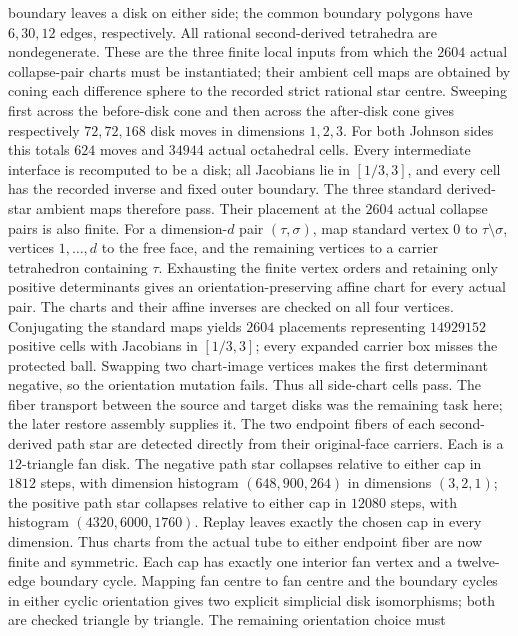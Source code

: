 \documentclass[11pt]{amsart}
\theoremstyle{definition}
\theoremstyle{remark}
\begin{document}
boundary leaves a disk on either side; the common boundary polygons have
$6,30,12$ edges, respectively.  All rational second-derived tetrahedra are
nondegenerate.  These are the three finite local inputs from which the $2604$
actual collapse-pair charts must be instantiated; their ambient cell maps
are obtained by coning each difference sphere to the recorded strict rational
star centre.  Sweeping first across the before-disk cone and then across the
after-disk cone gives respectively $72,72,168$ disk moves in dimensions
$1,2,3$.  For both Johnson sides this totals $624$ moves and $34944$ actual
octahedral cells.  Every intermediate interface is recomputed to be a disk;
all Jacobians lie in $[1/3,3]$, and every cell has the recorded inverse and
fixed outer boundary.  The three standard derived-star ambient maps therefore
pass.  Their placement at the $2604$ actual collapse pairs is also finite.
For a dimension-$d$ pair $(\tau,\sigma)$, map standard vertex $0$ to
$\tau\setminus\sigma$, vertices $1,\ldots,d$ to the free face, and the
remaining vertices to a carrier tetrahedron containing $\tau$.  Exhausting the
finite vertex orders and retaining only positive determinants gives an
orientation-preserving affine chart for every actual pair.  The charts and
their affine inverses are checked on all four vertices.  Conjugating the
standard maps yields $2604$ placements representing $14929152$ positive cells
with Jacobians in $[1/3,3]$; every expanded carrier box misses the protected
ball.  Swapping two chart-image vertices makes the first determinant negative,
so the orientation mutation fails.  Thus all side-chart cells pass.  The
fiber transport between the source and target disks was the remaining task
here; the later restore assembly supplies it.
The two endpoint fibers of each second-derived path star are detected directly
from their original-face carriers.  Each is a $12$-triangle fan disk.  The
negative path star collapses relative to either cap in $1812$ steps, with
dimension histogram $(648,900,264)$ in dimensions $(3,2,1)$; the positive
path star collapses relative to either cap in $12080$ steps, with histogram
$(4320,6000,1760)$.  Replay leaves exactly the chosen cap in every dimension.
Thus charts from the actual tube to either endpoint fiber are now finite and
symmetric.  Each cap has exactly one interior fan vertex and a twelve-edge
boundary cycle.  Mapping fan centre to fan centre and the boundary cycles in
either cyclic orientation gives two explicit simplicial disk isomorphisms;
both are checked triangle by triangle.  The remaining orientation choice must
\end{document}
